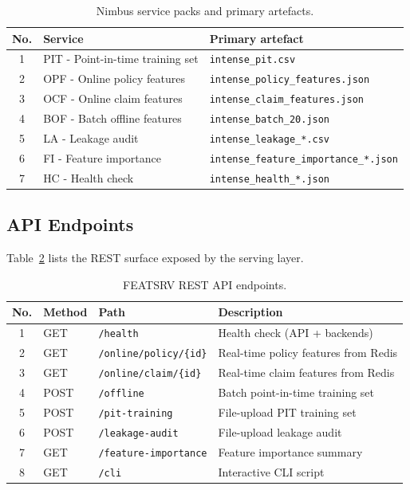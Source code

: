 \documentclass[11pt,a4paper]{article}
\begin{document}
\begin{table}[ht]
\centering
\caption{Nimbus service packs and primary artefacts.}
\label{tab:nimbus}
\begin{tabular}{@{}cll@{}}
\toprule
\textbf{No.} & \textbf{Service} & \textbf{Primary artefact} \\
\midrule
1 & PIT - Point-in-time training set & \texttt{intense\_pit.csv} \\
2 & OPF - Online policy features & \texttt{intense\_policy\_features.json} \\
3 & OCF - Online claim features & \texttt{intense\_claim\_features.json} \\
4 & BOF - Batch offline features & \texttt{intense\_batch\_20.json} \\
5 & LA - Leakage audit & \texttt{intense\_leakage\_*.csv} \\
6 & FI - Feature importance & \texttt{intense\_feature\_importance\_*.json} \\
7 & HC - Health check & \texttt{intense\_health\_*.json} \\
\bottomrule
\end{tabular}
\end{table}

\subsection{API Endpoints}
Table~\ref{tab:api} lists the REST surface exposed by the serving layer.

\begin{table}[ht]
\centering
\caption{FEATSRV REST API endpoints.}
\label{tab:api}
\begin{tabular}{@{}clll@{}}
\toprule
\textbf{No.} & \textbf{Method} & \textbf{Path} & \textbf{Description} \\
\midrule
1 & GET  & \texttt{/health}                 & Health check (API + backends) \\
2 & GET  & \texttt{/online/policy/\{id\}}  & Real-time policy features from Redis \\
3 & GET  & \texttt{/online/claim/\{id\}}   & Real-time claim features from Redis \\
4 & POST & \texttt{/offline}                & Batch point-in-time training set \\
5 & POST & \texttt{/pit-training}           & File-upload PIT training set \\
6 & POST & \texttt{/leakage-audit}          & File-upload leakage audit \\
7 & GET  & \texttt{/feature-importance}     & Feature importance summary \\
8 & GET  & \texttt{/cli}                    & Interactive CLI script \\
\bottomrule
\end{tabular}
\end{table}
\end{document}
